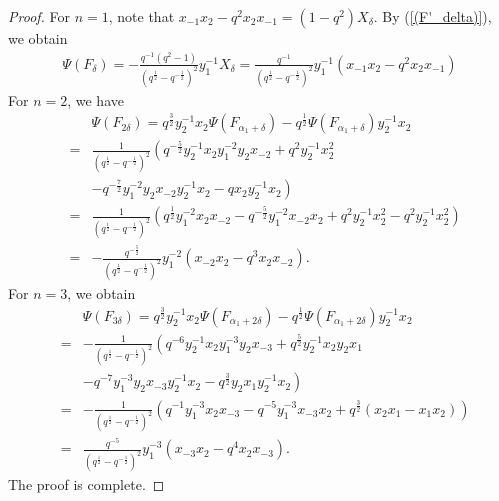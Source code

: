 \documentclass[reqno,11pt]{amsart}
\numberwithin{equation}{section}
\begin{document}
\begin{proof}
For $n=1$, note that $	x_{-1} x_2-q^2 x_2 x_{-1} =\left(1-q^2\right) X_\delta .$ By (\ref{(F'_delta)}), we obtain
\begin{eqnarray*}
\Psi \left( {{F_\delta }} \right) =  - \frac{{{q^{ - 1}}\left( {{q^2} - 1} \right)}}{{{{\left( {{q^{\frac{1}{2}}} - {q^{ - \frac{1}{2}}}} \right)}^2}}}y_1^{ - 1}{X_\delta } = \frac{{{q^{ - 1}}}}{{{{\left( {{q^{\frac{1}{2}}} - {q^{ - \frac{1}{2}}}} \right)}^2}}}y_1^{ - 1}\left( {{x_{ - 1}}{x_2} - {q^2}{x_2}{x_{ - 1}}} \right)
\end{eqnarray*}
For $n=2$, we have
\begin{eqnarray*}
	&&\Psi\left(F_{2 \delta}\right)=  q^{\frac{3}{2}} y_2^{-1} x_2 \Psi\left(F_{\alpha_1+\delta}\right)-q^{\frac{1}{2}} \Psi\left(F_{\alpha_1+\delta}\right) y_2^{-1} x_2 \\
	&= & \frac{1}{\left(q^{\frac{1}{2}}-q^{-\frac{1}{2}}\right)^2}\left(q^{-\frac{5}{2}} y_2^{-1} x_2 y_1^{-2} y_2 x_{-2}+q^2 y_2^{-1} x_2^2\right. \\
	&& \left.-q^{-\frac{7}{2}} y_1^{-2} y_2 x_{-2} y_2^{-1} x_2-q x_2 y_2^{-1} x_2\right) \\
	&= & \frac{1}{\left(q^{\frac{1}{2}}-q^{-\frac{1}{2}}\right)^2}\left(q^{\frac{1}{2}} y_1^{-2} x_2 x_{-2}-q^{-\frac{5}{2}} y_1^{-2} x_{-2} x_2+q^2 y_2^{-1} x_2^2-q^2 y_2^{-1} x_2^2\right) \\
	&= & -\frac{q^{-\frac{5}{2}}}{\left(q^{\frac{1}{2}}-q^{-\frac{1}{2}}\right)^2} y_1^{-2}\left(x_{-2} x_2-q^3 x_2 x_{-2}\right) .
\end{eqnarray*}
For $n=3$, we obtain
\begin{eqnarray*}
	&&\Psi\left(F_{3 \delta}\right)=  q^{\frac{3}{2}} y_2^{-1} x_2 \Psi\left(F_{\alpha_1+2 \delta}\right)-q^{\frac{1}{2}} \Psi\left(F_{\alpha_1+2 \delta}\right) y_2^{-1} x_2 \\
	&= & -\frac{1}{\left(q^{\frac{1}{2}}-q^{-\frac{1}{2}}\right)^2}\left(q^{-6} y_2^{-1} x_2 y_1^{-3} y_2 x_{-3}+q^{\frac{5}{2}} y_2^{-1} x_2 y_2 x_1\right. \\
	&& \left.-q^{-7} y_1^{-3} y_2 x_{-3} y_2^{-1} x_2-q^{\frac{3}{2}} y_2 x_1 y_2^{-1} x_2\right) \\
	&= & -\frac{1}{\left(q^{\frac{1}{2}}-q^{-\frac{1}{2}}\right)^2}\left(q^{-1} y_1^{-3} x_2 x_{-3}-q^{-5} y_1^{-3} x_{-3} x_2+q^{\frac{3}{2}}\left(x_2 x_1-x_1 x_2\right)\right) \\
	&= & \frac{q^{-5}}{\left(q^{\frac{1}{2}}-q^{-\frac{1}{2}}\right)^2} y_1^{-3}\left(x_{-3} x_2-q^4 x_2 x_{-3}\right) .
\end{eqnarray*}
The proof is complete.
\end{proof}
\end{document}
